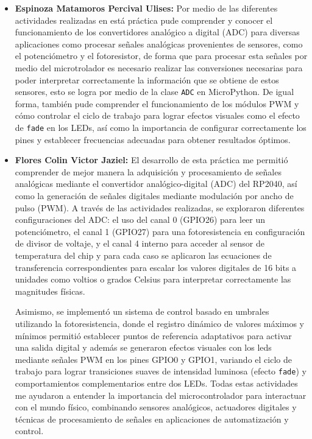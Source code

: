 \documentclass[letterpaper,12pt]{article}
\begin{document}
    \begin{itemize}
        \item \textbf{Espinoza Matamoros Percival Ulises:} Por medio de las diferentes actividades realizadas en está práctica pude comprender y conocer el funcionamiento de los convertidores analógico a digital (ADC) para diversas aplicaciones como procesar señales analógicas provenientes de sensores, como el potenciómetro y el fotoresistor, de forma que para procesar esta señales por medio del microtrolador es necesario realizar las conversiones necesarias para poder interpretar correctamente la información que se obtiene de estos sensores, esto se logra por medio de la clase \texttt{ADC} en MicroPython. De igual forma, también pude comprender el funcionamiento de los módulos PWM y cómo controlar el ciclo de trabajo para lograr efectos visuales como el  efecto de \texttt{fade} en los LEDs, así como la importancia de configurar correctamente los pines y establecer frecuencias adecuadas para obtener resultados óptimos.
        

        \item \textbf{Flores Colin Victor Jaziel:}
        El desarrollo de esta práctica me permitió comprender de mejor manera la adquisición y procesamiento de señales analógicas mediante el convertidor analógico-digital (ADC) del RP2040, así como la generación de señales digitales mediante modulación por ancho de pulso (PWM). A través de las actividades realizadas, se exploraron diferentes configuraciones del ADC: el uso del canal 0 (GPIO26) para leer un potenciómetro, el canal 1 (GPIO27) para una fotoresistencia en configuración de divisor de voltaje, y el canal 4 interno para acceder al sensor de temperatura del chip y para cada caso se aplicaron las ecuaciones de transferencia correspondientes para escalar los valores digitales de 16 bits a unidades como voltios o grados Celsius para interpretar correctamente las magnitudes físicas.

        Asimismo, se implementó un sistema de control basado en umbrales utilizando la fotoresistencia, donde el registro dinámico de valores máximos y mínimos permitió establecer puntos de referencia adaptativos para activar una salida digital y además se generaron efectos visuales con los leds mediante señales PWM en los pines GPIO0 y GPIO1, variando el ciclo de trabajo para lograr transiciones suaves de intensidad luminosa (efecto \texttt{fade}) y comportamientos complementarios entre dos LEDs. Todas estas actividades me ayudaron a entender la importancia del microcontrolador para interactuar con el mundo físico, combinando sensores analógicos, actuadores digitales y técnicas de procesamiento de señales en aplicaciones de automatización y control.


\end{itemize}
\end{document}
